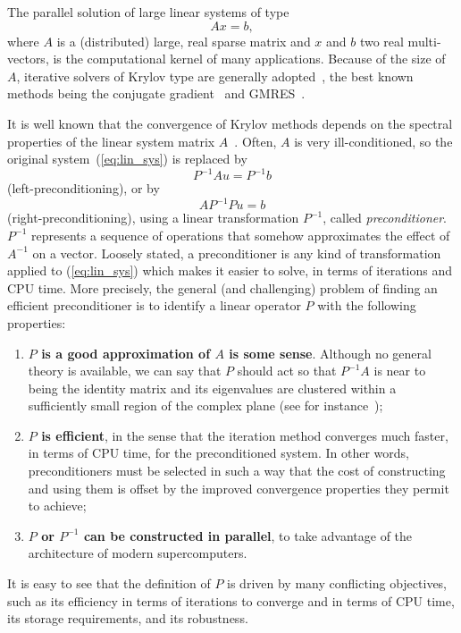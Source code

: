 \documentclass{article}[11pt]
\begin{document}
The parallel solution of large linear systems of type
\begin{equation}
\label{eq:lin_sys}
A {x} = {b},
\end{equation}
where $A$ is a (distributed) large, real sparse matrix and $x$ and $b$ two real
multi-vectors, is the computational kernel of many applications. Because of
the size of $A$, iterative solvers of Krylov type are generally
adopted~\cite{barret93templates}, the
best known methods being the conjugate gradient~\cite{hestenes52method} and
GMRES~\cite{saad86gmres}.
  
It is well known that the convergence of Krylov methods depends on 
the spectral properties of the linear system matrix
$A$~\cite{axelsson94iterative,saad96iterative,QSS}. Often, $A$ is very
ill-conditioned, so the
original system~(\ref{eq:lin_sys}) is replaced by
\[
P^{-1} A{u} = P^{-1} {b}
\]
(left-preconditioning), or by
\[
A P^{-1} P {u} = {b}
\]
(right-preconditioning), using a linear transformation $P^{-1}$,
called {\sl preconditioner}. $P^{-1}$ represents a sequence of operations
that somehow approximates the effect of $A^{-1}$ on a vector. 
Loosely stated, a preconditioner is any
kind of transformation applied to (\ref{eq:lin_sys}) which makes it
easier to solve, in terms of iterations and CPU time. More precisely,
the general (and challenging) problem of finding an efficient
preconditioner is to identify a linear operator $P$ with the following
properties:
\begin{enumerate}
\item {\bf $P$ is a good approximation of $A$ is some sense}. Although no
  general theory is available, we can say that $P$ should act so that
  $P^{-1} A$ is near to being the identity matrix and its eigenvalues
  are clustered within a sufficiently small region of the complex plane 
  (see for instance~\cite{greenbaum97iterative});
\item {\bf $P$ is efficient}, in the sense that the iteration method converges
  much faster, in terms of CPU time, for the preconditioned system.  In
  other words, preconditioners must be selected in such a way that the
  cost of constructing and using them is offset by the improved
  convergence properties they permit to achieve;
\item {\bf $P$ or $P^{-1}$ can be constructed in parallel}, to take advantage of the architecture of modern supercomputers.
\end{enumerate}

It is easy to see that the definition of $P$ is driven by many conflicting
objectives, such as its efficiency in terms of iterations to converge and in
terms of CPU time, its storage requirements, and its robustness. 
\end{document}
